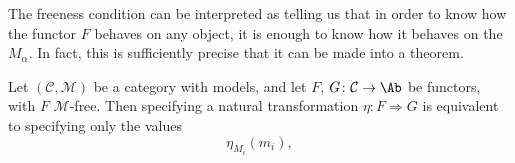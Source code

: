 \documentclass[main.tex]{subfiles}
\begin{document}
The freeness condition can be interpreted as telling us that in order to know how the functor $F$ behaves on any object, it is enough to know how it behaves on the $M_{\alpha}$. In fact, this is sufficiently precise that it can be made into a theorem.

\begin{proposition}
  Let \((\mathcal{C}, \mathcal{M})\) be a category with models, and let \(F\), \(G\colon \mathcal{C} \to \Ab\) be functors, with \(F\) \(\mathcal{M}\)-free. Then specifying a natural transformation \(\eta\colon F \Rightarrow G\) is equivalent to specifying only the values
  \begin{equation*}
    \eta_{M_{i}}(m_{i}),
  \end{equation*}

\end{proposition}
\end{document}

